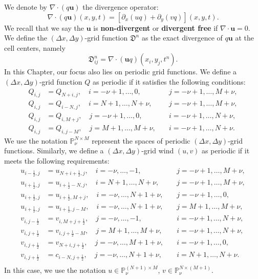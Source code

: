 We denote by $\nabla \cdot (q\boldsymbol{u})$ the divergence operator:
\begin{equation}
	\label{sec-adv2d:eqdiv}
	\nabla \cdot (q\boldsymbol{u})(x, y, t) =  
	[{\partial_x (uq)} + {\partial_y (vq)}](x, y, t).
\end{equation}
We recall that we say the $\boldsymbol{u}$ is \textbf{non-divergent} or \textbf{divergent free}  if $\nabla \cdot \boldsymbol{u}=0$.
We define the $(\Delta x, \Delta y)$-grid function $\mathfrak{D}^n$ as
the exact divergence of $q\boldsymbol{u}$ at the cell centers, namely
\begin{equation}
\label{2d-discrete-div}
\mathfrak{D}^n_{ij} = \nabla \cdot (\boldsymbol{u}q)(x_i,y_j,t^n).
\end{equation}
In this Chapter, our focus also lies on periodic grid functions.
We define a $(\Delta x, \Delta y)$-grid function $Q$ as periodic if it satisfies the following conditions:
\begin{align*}
    Q_{i,j} &= Q_{N+i,j}, \quad i=-\nu+1, \ldots, 0,  \quad &j = -\nu+1, \ldots, M+\nu,\\
    Q_{i,j} &= Q_{i-N,j}, \quad i=N+1, \ldots, N+\nu, \quad &j = -\nu+1, \ldots, M+\nu,\\
    Q_{i,j} &= Q_{i,M+j}, \quad j=-\nu+1, \ldots, 0,  \quad &i = -\nu+1, \ldots, N+\nu,\\
    Q_{i,j} &= Q_{i,j-M}, \quad j=M+1, \ldots, M+\nu, \quad &i = -\nu+1, \ldots, N+\nu.
\end{align*}
We use the notation $\mathbb{P}^{N \times M}_{\nu}$ represent the spaces of periodic $(\Delta x, \Delta y)$-grid functions.
Similarly, we define a $(\Delta x, \Delta y)$-grid wind $(u,v)$ as periodic if it meets the following requirements:
\begin{align*}
    u_{i-\frac{1}{2},j} &= u_{N+i+\frac{1}{2},j} , \quad i=-\nu, \ldots, -1,   \quad &j = -\nu+1, \ldots, M+\nu,\\
    u_{i+\frac{1}{2},j} &= u_{i+\frac{1}{2}-N,j} , \quad i=N+1, \ldots, N+\nu, \quad &j = -\nu+1, \ldots, M+\nu,\\
    u_{i+\frac{1}{2},j} &= u_{i+\frac{1}{2},M+j} , \quad i=-\nu, \ldots, N+1+\nu,   \quad &j = -\nu+1, \ldots, 0,\\
    u_{i+\frac{1}{2},j} &= u_{i+\frac{1}{2},j-M} , \quad i=-\nu, \ldots, N+1+\nu,   \quad &j = M+1, \ldots, M+\nu,\\
    v_{i,j-\frac{1}{2}} &= v_{i,M+j+\frac{1}{2}} , \quad j=-\nu, \ldots, -1,   \quad &i = -\nu+1, \ldots, N+\nu,\\
    v_{i,j+\frac{1}{2}} &= v_{i,j+\frac{1}{2}-M} , \quad j=M+1, \ldots, M+\nu, \quad &i = -\nu+1, \ldots, N+\nu,\\
    v_{i,j+\frac{1}{2}} &= v_{N+i,j+\frac{1}{2}} , \quad j=-\nu, \ldots, M+1+\nu,   \quad &i = -\nu+1, \ldots, 0,\\
    v_{i,j+\frac{1}{2}} &= c_{i-N,j+\frac{1}{2}} , \quad j=-\nu, \ldots, N+1+\nu,   \quad &i = N+1, \ldots, N+\nu.\\
\end{align*}
In this case, we use the notation $u \in \mathbb{P}^{(N+1) \times M}_{\nu}$, 
$v \in \mathbb{P}^{N \times (M+1)}_{\nu}$.

